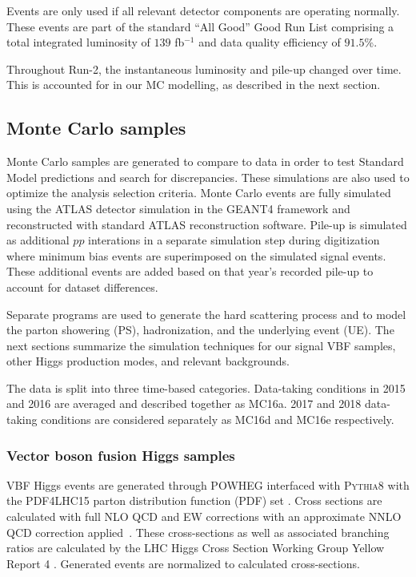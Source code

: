 Events are only used if all relevant detector components are operating normally. These events are part of the standard ``All Good'' Good Run List comprising a total integrated luminosity of $139$ fb$^{-1}$ and data quality efficiency of $91.5$\%.

Throughout Run-2, the instantaneous luminosity and pile-up changed over time. This is accounted for in our MC modelling, as described in the next section.

\subsection{Monte Carlo samples}

Monte Carlo samples are generated to compare to data in order to test Standard Model predictions and search for discrepancies. These simulations are also used to optimize the analysis selection criteria. Monte Carlo events are fully simulated using the ATLAS detector simulation in the GEANT4 framework \cite{GEANT4} and reconstructed with standard ATLAS reconstruction software. Pile-up is simulated as additional $pp$ interations in a separate simulation step during digitization where minimum bias events are superimposed on the simulated signal events. These additional events are added based on that year's recorded pile-up to account for dataset differences. 

Separate programs are used to generate the hard scattering process and to model the parton showering (PS), hadronization, and the underlying event (UE). The next sections summarize the simulation techniques for our signal VBF samples, other Higgs production modes, and relevant backgrounds.   

The data is split into three time-based categories. Data-taking conditions in 2015 and 2016 are averaged and described together as MC16a. 2017 and 2018 data-taking conditions are considered separately as MC16d and MC16e respectively. 

\subsubsection{Vector boson fusion Higgs samples}

VBF Higgs events are generated through \textsc{POWHEG} \cite{Nason:2009ai} interfaced with \textsc{Pythia8} with the PDF4LHC15 parton distribution function (PDF) set \cite{PDF4LHC15}. Cross sections are calculated with full NLO QCD and EW corrections \cite{Ciccolini:2007jr, Arnold:2008rz} with an approximate NNLO QCD correction applied~\cite{Bolzoni:2010xr}. These cross-sections as well as associated branching ratios are calculated by the LHC Higgs Cross Section Working Group Yellow Report 4 \cite{LHCCrossSectionWG}. Generated events are normalized to calculated cross-sections. 
